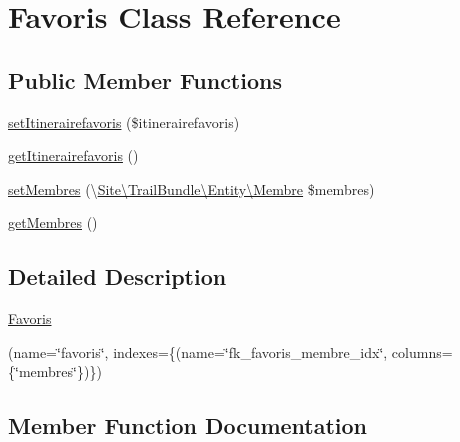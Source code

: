 \hypertarget{class_site_1_1_trail_bundle_1_1_entity_1_1_favoris}{}\section{Favoris Class Reference}
\label{class_site_1_1_trail_bundle_1_1_entity_1_1_favoris}
\subsection*{Public Member Functions}
\begin{DoxyCompactItemize}
\item 
\hyperlink{class_site_1_1_trail_bundle_1_1_entity_1_1_favoris_a96fa2ec628245fd96a39aacdae822d5b}{set\+Itinerairefavoris} (\$itinerairefavoris)
\item 
\hyperlink{class_site_1_1_trail_bundle_1_1_entity_1_1_favoris_aa260436362fb6e3640d9822839493b81}{get\+Itinerairefavoris} ()
\item 
\hyperlink{class_site_1_1_trail_bundle_1_1_entity_1_1_favoris_a0395573c22fb79e14318df70df8ef849}{set\+Membres} (\textbackslash{}\hyperlink{class_site_1_1_trail_bundle_1_1_entity_1_1_membre}{Site\textbackslash{}\+Trail\+Bundle\textbackslash{}\+Entity\textbackslash{}\+Membre} \$membres)
\item 
\hyperlink{class_site_1_1_trail_bundle_1_1_entity_1_1_favoris_a93b4b936a773033c18f878f625c0ca5a}{get\+Membres} ()
\end{DoxyCompactItemize}


\subsection{Detailed Description}
\hyperlink{class_site_1_1_trail_bundle_1_1_entity_1_1_favoris}{Favoris}

(name=\char`\"{}favoris\char`\"{}, indexes=\{(name=\char`\"{}fk\+\_\+favoris\+\_\+membre\+\_\+idx\char`\"{}, columns=\{\char`\"{}membres\char`\"{}\})\})  

\subsection{Member Function Documentation}
\hypertarget{class_site_1_1_trail_bundle_1_1_entity_1_1_favoris_aa260436362fb6e3640d9822839493b81}{}
